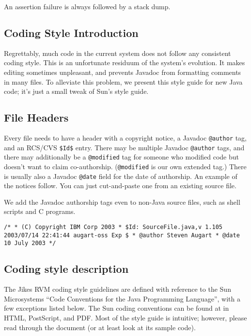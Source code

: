 An assertion failure is always followed by a stack dump.


\subsection{Coding Style Introduction}

Regrettably, much code in the current system does not follow any
consistent coding style.  This is an unfortunate residuum of the
system's evolution.  It makes editing sometimes unpleasant, and
prevents Javadoc from formatting comments in many files.  To alleviate
this problem, we present this style guide for new Java code; it's just
a small tweak of Sun\Rweb{}'s style guide.

\subsection{File Headers}

Every file needs to have a header with a copyright notice, a Javadoc
{\tt @author} tag, and an RCS/CVS {\tt \$Id\$} entry. There may be
multiple Javadoc {\tt @author} tags, and there may
additionally be a {\tt @modified} tag for someone who modified code but
doesn't want to claim co-authorship.  ({\tt @modified} is our own
extended tag.)  There is usually also a Javadoc {\tt @date} field for
the date of authorship.  An example of the notices follow.  You can
just cut-and-paste one from an existing source file.

We add the Javadoc authorship tags even to non-Java source files, such
as shell scripts and C programs.
\begin{example}
\tt{}/*
 * (C) Copyright IBM Corp 2003
 * \${}Id{}: SourceFile.java,v 1.105 2003/07/14 22:41:44 augart-oss Exp \$
 * @author Steven Augart
 * @date 10 July 2003
 */
\end{example}


\subsection {Coding style description}

The Jikes\TMweb{} RVM coding style guidelines are defined with
reference to the Sun\Rweb{} 
Microsystems ``Code Conventions for the Java\TMweb{} Programming Language'',
with a few exceptions listed below.  The Sun coding
conventions can be found at 
\xlink{{\tt \SunCodeConventionURL}} {\SunCodeConventionURL} in HTML,
PostScript, and PDF.  Most of the style guide is intuitive; 
however, please read through the document (or at least look at its sample code).

